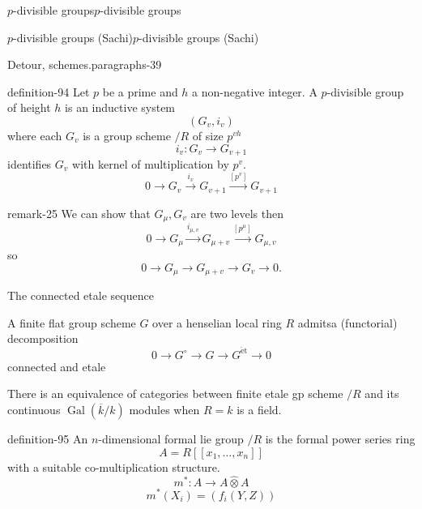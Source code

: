 \documentclass[10pt,]{book}
\numberwithin{equation}{section}
\newcommand{\lb}{[}
\newcommand{\rb}{]}
\newcommand{\et}{\mathrm{\acute{e}t}}
\newcommand{\absgal}[1]{\operatorname{Gal}(\overline{#1}/#1)}
\begin{document}
\begin{chapterptx}{\(p\)-divisible groups}{}{\(p\)-divisible groups}{}{}
\begin{sectionptx}{\(p\)-divisible groups (Sachi)}{}{\(p\)-divisible groups (Sachi)}{}{}
\begin{paragraphs}{Detour, schemes.}{paragraphs-39}
\begin{definition}{}{definition-94}
\hypertarget{p-1001}{}%
Let \(p\) be a prime and \(h\) a non-negative integer. A \(p\)-divisible group of height \(h\) is an inductive system%
\begin{equation*}
(G_v, i_v)
\end{equation*}
where each \(G_v\) is a group scheme \(/R\) of size \(p^{vh}\)%
\begin{equation*}
i_v \colon G_v \to G_{v+1}
\end{equation*}
identifies \(G_v\) with kernel of multiplication by \(p^v\).%
\begin{equation*}
0 \to G_v \xrightarrow{i_v} G_{v+1} \xrightarrow{[p^v]} G_{v+1}
\end{equation*}
%
\end{definition}
\begin{remark}{}{remark-25}%
\hypertarget{p-1002}{}%
We can show that \(G_\mu,G_v\) are two levels then%
\begin{equation*}
0 \to G_\mu \xrightarrow{i_{\mu, v}} G_{\mu +v } \xrightarrow{[p^\mu]} G_{\mu,v}
\end{equation*}
so%
\begin{equation*}
0 \to G_\mu \to G_{\mu + v}  \to G_v \to 0\text{.}
\end{equation*}
%
\end{remark}
\hypertarget{p-1003}{}%
The connected etale sequence%
\par
\hypertarget{p-1004}{}%
A finite flat group scheme \(G\) over a henselian local ring \(R\) admitsa (functorial) decomposition%
\begin{equation*}
0  \to G^\circ \to G \to G^\et \to 0
\end{equation*}
connected and etale%
\par
\hypertarget{p-1005}{}%
There is an equivalence of categories between finite etale gp scheme \(/R\) and its continuous \(\absgal k\) modules when \(R = k\) is a field.%
\begin{definition}{}{definition-95}%
\hypertarget{p-1006}{}%
An \(n\)-dimensional formal lie group \(/R\) is the formal power series ring%
\begin{equation*}
A = R\lb \lb x_1, \ldots, x_n \rb\rb
\end{equation*}
with a suitable co-multiplication structure.%
\begin{equation*}
m^* \colon A \to A\widehat \otimes A
\end{equation*}
%
\begin{equation*}
m^*(X_i) = (f_i(Y,Z))
\end{equation*}

\end{definition}
\end{paragraphs}
\end{sectionptx}
\end{chapterptx}
\end{document}
